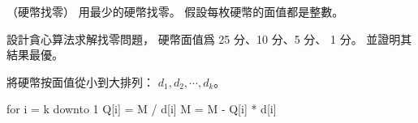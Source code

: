 \startPROBLEM
（硬幣找零）
用最少的硬幣找零。
假設每枚硬幣的面值都是整數。

\startigBase[a]\startitem
設計貪心算法求解找零問題，
硬幣面值爲 25 分、10 分、5 分、 1 分。
並證明其結果最優。
\stopitem\stopigBase

\startANSWER
將硬幣按面值從小到大排列： $d_1,d_2,\cdots,d_k$。

\startCLRSCODE
for i = k downto 1
	Q[i] = \lfloor M / d[i]\rfloor
	M = M - Q[i] * d[i]
\stopCLRSCODE
\stopANSWER

\stopPROBLEM

